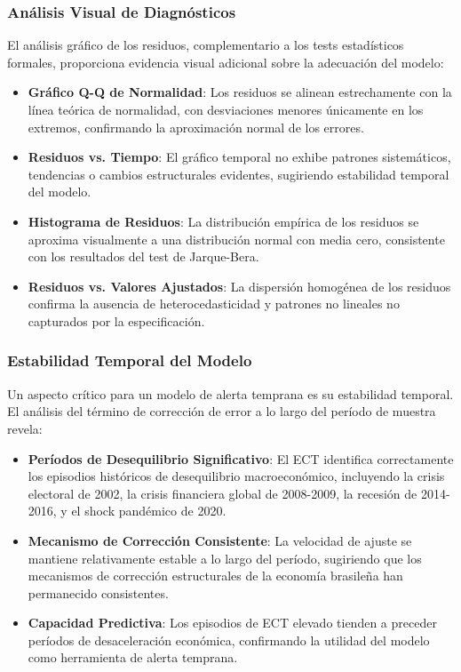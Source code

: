 \documentclass[3p,11pt]{elsarticle}
\begin{document}
\subsubsection{Análisis Visual de Diagnósticos}

El análisis gráfico de los residuos, complementario a los tests estadísticos formales, proporciona evidencia visual adicional sobre la adecuación del modelo:

\begin{itemize}
    \item \textbf{Gráfico Q-Q de Normalidad}: Los residuos se alinean estrechamente con la línea teórica de normalidad, con desviaciones menores únicamente en los extremos, confirmando la aproximación normal de los errores.
    
    \item \textbf{Residuos vs. Tiempo}: El gráfico temporal no exhibe patrones sistemáticos, tendencias o cambios estructurales evidentes, sugiriendo estabilidad temporal del modelo.
    
    \item \textbf{Histograma de Residuos}: La distribución empírica de los residuos se aproxima visualmente a una distribución normal con media cero, consistente con los resultados del test de Jarque-Bera.
    
    \item \textbf{Residuos vs. Valores Ajustados}: La dispersión homogénea de los residuos confirma la ausencia de heterocedasticidad y patrones no lineales no capturados por la especificación.
\end{itemize}

\subsubsection{Estabilidad Temporal del Modelo}

Un aspecto crítico para un modelo de alerta temprana es su estabilidad temporal. El análisis del término de corrección de error a lo largo del período de muestra revela:

\begin{itemize}
    \item \textbf{Períodos de Desequilibrio Significativo}: El ECT identifica correctamente los episodios históricos de desequilibrio macroeconómico, incluyendo la crisis electoral de 2002, la crisis financiera global de 2008-2009, la recesión de 2014-2016, y el shock pandémico de 2020.
    
    \item \textbf{Mecanismo de Corrección Consistente}: La velocidad de ajuste se mantiene relativamente estable a lo largo del período, sugiriendo que los mecanismos de corrección estructurales de la economía brasileña han permanecido consistentes.
    
    \item \textbf{Capacidad Predictiva}: Los episodios de ECT elevado tienden a preceder períodos de desaceleración económica, confirmando la utilidad del modelo como herramienta de alerta temprana.
\end{itemize}
\end{document}
